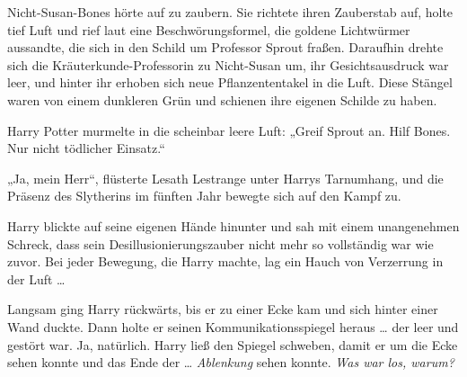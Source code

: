 Nicht-Susan-Bones hörte auf zu zaubern. Sie richtete ihren Zauberstab auf, holte tief Luft und rief laut eine Beschwörungsformel, die goldene Lichtwürmer aussandte, die sich in den Schild um Professor Sprout fraßen. Daraufhin drehte sich die Kräuterkunde-Professorin zu Nicht-Susan um, ihr Gesichtsausdruck war leer, und hinter ihr erhoben sich neue Pflanzententakel in die Luft. Diese Stängel waren von einem dunkleren Grün und schienen ihre eigenen Schilde zu haben.

Harry Potter murmelte in die scheinbar leere Luft:
„Greif Sprout an. Hilf Bones. Nur nicht tödlicher Einsatz.“

„Ja, mein Herr“, flüsterte Lesath Lestrange unter Harrys Tarnumhang, und die Präsenz des Slytherins im fünften Jahr bewegte sich auf den Kampf zu.

Harry blickte auf seine eigenen Hände hinunter und sah mit einem unangenehmen Schreck, dass sein Desillusionierungszauber nicht mehr so vollständig war wie zuvor. Bei jeder Bewegung, die Harry machte, lag ein Hauch von Verzerrung in der Luft …

Langsam ging Harry rückwärts, bis er zu einer Ecke kam und sich hinter einer Wand duckte. Dann holte er seinen Kommunikationsspiegel heraus … der leer und gestört war. Ja, natürlich. Harry ließ den Spiegel schweben, damit er um die Ecke sehen konnte und das Ende der … \emph{Ablenkung} sehen konnte.
\emph{Was war los, warum?}

